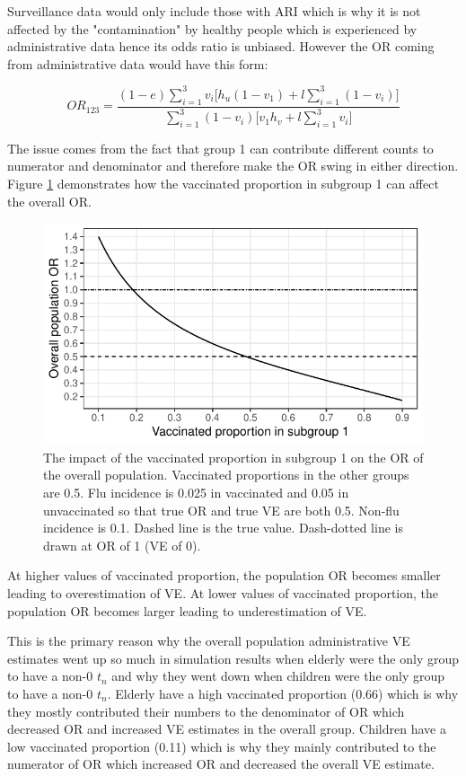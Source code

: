 \documentclass[11pt]{article}
\begin{document}
Surveillance data would only include those with ARI which is why it is not affected by the "contamination" by healthy people which is experienced by administrative data hence its odds ratio is unbiased. However the OR coming from administrative data would have this form:

\begin{equation} \label{ORBad}
OR_{1 2 3} = \frac
{(1-e) \sum_{i=1}^3 v_i \Big[ h_u(1-v_1) + l\sum_{i=1}^3(1-v_i) \Big]}
{\sum_{i=1}^3 (1-v_i) \Big[ v_1h_v+l \sum_{i=1}^3 v_i \Big]}
\end{equation}

The issue comes from the fact that group 1 can contribute different counts to numerator and denominator and therefore make the OR swing in either direction. Figure \ref{fig:ortn} demonstrates how the vaccinated proportion in subgroup 1 can affect the overall OR.

\pagebreak

\begin{figure}[h]
	\centering
		\includegraphics[width=0.75\linewidth]{../fig-ortn/fig-ortn.pdf}
		\caption{
The impact of the vaccinated proportion in subgroup 1 on the OR of the overall population. Vaccinated proportions in the other groups are 0.5. Flu incidence is 0.025 in vaccinated and 0.05 in unvaccinated so that true OR and true VE are both 0.5. Non-flu incidence is 0.1. Dashed line is the true value. Dash-dotted line is drawn at OR of 1 (VE of 0). \label{fig:ortn}
		}
\end{figure}

At higher values of vaccinated proportion, the population OR becomes smaller leading to overestimation of VE. At lower values of vaccinated proportion, the population OR becomes larger leading to underestimation of VE.

This is the primary reason why the overall population administrative VE estimates went up so much in simulation results when elderly were the only group to have a non-0 $t_n$ and why they went down when children were the only group to have a non-0 $t_n$. Elderly have a high vaccinated proportion (0.66) which is why they mostly contributed their numbers to the denominator of OR which decreased OR and increased VE estimates in the overall group. Children have a low vaccinated proportion (0.11) which is why they mainly contributed to the numerator of OR which increased OR and decreased the overall VE estimate. 
\end{document}
